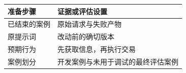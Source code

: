 \begin{tabular}{@{}P{4.0cm}P{8.5cm}@{}}
\toprule
\textbf{准备步骤} & \textbf{证据或评估设置} \\
\midrule
已结束的案例 & 原始请求与失败产物 \\
原提示词 & 改动前的确切版本 \\
预期行为 & 先获取信息，再执行交易 \\
案例划分 & 开发案例与未用于调试的最终评估案例 \\
\bottomrule
\end{tabular}
